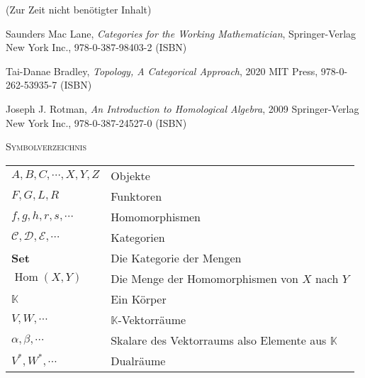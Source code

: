 \documentclass[a4paper]{amsart}
\theoremstyle{definition}
\DeclareMathOperator{\Hom}{Hom}
\newcommand{\K}{\ensuremath{\mathbb{ K }}}
\begin{document}
\begin{backup}
    (Zur Zeit nicht benötigter Inhalt)
\end{backup}

\begin{thebibliography}{9}

      Saunders Mac Lane, \emph{Categories for the Working Mathematician},
      Springer-Verlag New York Inc., 978-0-387-98403-2 (ISBN)
      
      Tai-Danae Bradley, \emph{Topology, A Categorical Approach},
      2020 MIT Press, 978-0-262-53935-7 (ISBN)

   	Joseph J. Rotman, \emph{An Introduction to Homological Algebra},
   	2009 Springer-Verlag New York Inc., 978-0-387-24527-0 (ISBN)
      
\end{thebibliography}

\begin{large}
    \centerline{\textsc{Symbolverzeichnis}}
\end{large}
\bigskip

\renewcommand*{\arraystretch}{1}

\begin{tabular}{ll}
    $A, B, C, \cdots, X, Y, Z$          & Objekte\\
    $F,G,L,R$ & Funktoren\\
    $f, g, h, r, s, \cdots$   & Homomorphismen\\
    $\mathcal C, \mathcal D, \mathcal E, \cdots$ & Kategorien\\
    \textbf{Set} & Die Kategorie der Mengen\\
    $\Hom( X, Y)$ & Die Menge der Homomorphismen von $X$ nach $Y$\\
    $\K$         &Ein Körper\\
    $V, W, \cdots$ &$\K$-Vektorräume\\
    $\alpha, \beta, \cdots$ & Skalare des Vektorraums also Elemente aus $\K$\\
    $V^*, W^*, \cdots$ & Dualräume
\end{tabular}
\end{document}
